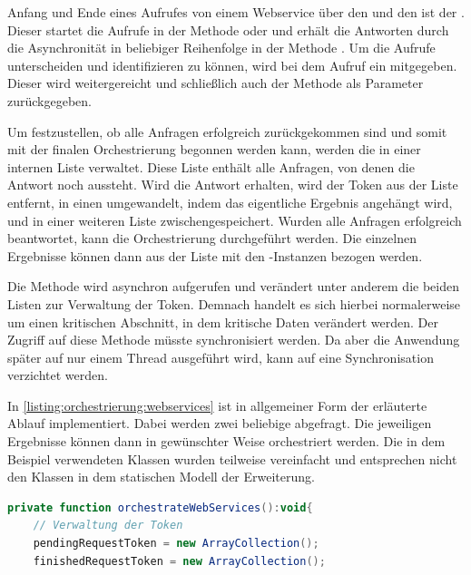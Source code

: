 \begin{onehalfspacing}
Anfang und Ende eines Aufrufes von einem Webservice über den  und den  ist der . Dieser startet die Aufrufe in der Methode  oder  und erhält die Antworten durch die Asynchronität in beliebiger Reihenfolge in der Methode . Um die Aufrufe unterscheiden und identifizieren zu können, wird bei dem Aufruf ein  mitgegeben. Dieser wird weitergereicht und schließlich auch der Methode  als Parameter zurückgegeben.

Um festzustellen, ob alle Anfragen erfolgreich zurückgekommen sind und somit mit der finalen Orchestrierung begonnen werden kann, werden die  in einer internen Liste verwaltet. Diese Liste enthält alle Anfragen, von denen die Antwort noch aussteht. Wird die Antwort erhalten, wird der Token aus der Liste entfernt, in einen  umgewandelt, indem das eigentliche Ergebnis angehängt wird, und in einer weiteren Liste zwischengespeichert. Wurden alle Anfragen erfolgreich beantwortet, kann die Orchestrierung durchgeführt werden. Die einzelnen Ergebnisse können dann aus der Liste mit den -Instanzen bezogen werden.

Die Methode  wird asynchron aufgerufen und verändert unter anderem die beiden Listen zur Verwaltung der Token. Demnach handelt es sich hierbei normalerweise um einen kritischen Abschnitt, in dem kritische Daten verändert werden. Der Zugriff auf diese Methode müsste synchronisiert werden. Da aber die Anwendung später auf nur einem Thread ausgeführt wird, kann auf eine Synchronisation verzichtet werden.

In \vref{listing:orchestrierung:webservices} ist in allgemeiner Form der erläuterte Ablauf implementiert. Dabei werden zwei beliebige  abgefragt. Die jeweiligen Ergebnisse können dann in gewünschter Weise orchestriert werden. Die in dem Beispiel verwendeten Klassen wurden teilweise vereinfacht und entsprechen nicht den Klassen in dem statischen Modell der Erweiterung.

\begin{programm}[ht]
\begin{lstlisting}[language=ActionScript]
private function orchestrateWebServices():void{
	// Verwaltung der Token
	pendingRequestToken = new ArrayCollection();
	finishedRequestToken = new ArrayCollection();
	

\end{lstlisting}
\end{programm}
\end{onehalfspacing}

